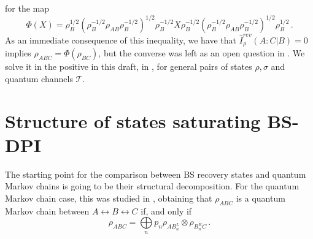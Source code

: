 \documentclass[11pt]{article}
\theoremstyle{newdefinition}
\theoremstyle{newplain}
\theoremstyle{myplain}
\DeclareMathOperator{\1}{\mathds{1}}
\begin{document}
for the map
\begin{equation}\label{MapPhi}
    \Phi(X) = \rho_B^{1/2}(\rho_B^{-1/2}\rho_{AB}\rho_B^{-1/2})^{1/2}\rho_B^{-1/2}X\rho_B^{-1/2}(\rho_B^{-1/2}\rho_{AB}\rho_B^{-1/2})^{1/2}\rho_B^{1/2} \, . 
\end{equation}
As an immediate consequence of this inequality, we have that $ \widehat{I}^{rev}_{\rho}(A:C | B) = 0$ implies $\rho_{ABC}= \Phi(\rho_{BC}) $, but the converse was left as an open question in \cite{gondolf2024conditional}. We solve it in the positive in this draft, in , for general pairs of states $\rho, \sigma$ and quantum channels $\mathcal{T}$. 



\section{Structure of states saturating BS-DPI}

The starting point for the comparison between BS recovery states and quantum Markov chains is going to be their structural decomposition. For the quantum Markov chain case, this was studied in \cite{HaydenJozsaPetzWinter-StrongSubadditivity-2004}, obtaining that $\rho_{ABC}$ is a quantum Markov chain between $A \leftrightarrow B \leftrightarrow C $ if, and only if
\begin{equation}
    \rho_{ABC} = \underset{n }{\bigoplus} p_n \rho_{AB_n^L} \otimes  \rho_{B_n^R C} \, .
\end{equation}
\end{document}
